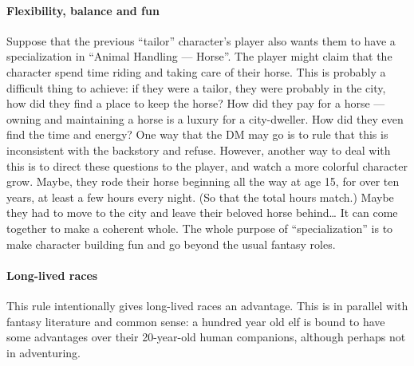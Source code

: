 \documentclass[twocolumn]{dndbook}
\begin{document}
\paragraph*{Flexibility, balance and fun}
Suppose that the previous ``tailor'' character's player also wants them to have a specialization in ``Animal Handling --- Horse''.
The player might claim that the character spend time riding and taking care of their horse.
This is probably a difficult thing to achieve: if they were a tailor, they were probably in the city, how did they find a place to keep the horse?
How did they pay for a horse --- owning and maintaining a horse is a luxury for a city-dweller.
How did they even find the time and energy?
One way that the DM may go is to rule that this is inconsistent with the backstory and refuse.
However, another way to deal with this is to direct these questions to the player, and watch a more colorful character grow.
Maybe, they rode their horse beginning all the way at age 15, for over ten years, at least a few hours every night.
(So that the total hours match.)
Maybe they had to move to the city and leave their beloved horse behind\ldots
It can come together to make a coherent whole.
The whole purpose of ``specialization'' is to make character building fun and go beyond the usual fantasy roles.\par


\paragraph*{Long-lived races} This rule intentionally gives long-lived races an advantage.
This is in parallel with fantasy literature and common sense: a hundred year old elf is
bound to have some advantages over their 20-year-old human companions, although perhaps not in adventuring.\par
\end{document}
